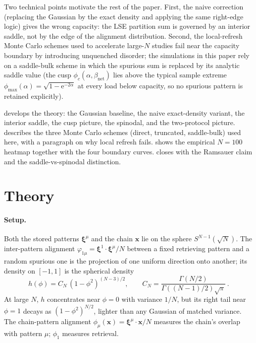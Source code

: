 \documentclass[11pt]{article}
\newcommand{\bxi}{\boldsymbol{\xi}}
\newcommand{\bx}{\bm{x}}
\newcommand{\e}{{\mathrm{e}}}
\newcommand{\Bnet}{\beta_{\mathrm{net}}}
\begin{document}
Two technical points motivate the rest of the paper.  First, the naive
correction (replacing the Gaussian by the exact density and applying
the same right-edge logic) gives the wrong capacity: the LSE partition
sum is governed by an interior saddle, not by the edge of the alignment
distribution.  Second, the local-refresh Monte Carlo schemes used to
accelerate large-$N$ studies fail near the capacity boundary by
introducing unquenched disorder; the simulations in this paper rely on a
saddle-bulk scheme in which the spurious sum is replaced by its analytic
saddle value (the cusp $\phi_c(\alpha, \Bnet)$ lies above the typical
sample extreme $\phi_{\max}(\alpha) = \sqrt{1 - \e^{-2\alpha}}$ at every
load below capacity, so no spurious pattern is retained explicitly).

 develops the theory: the Gaussian baseline, the naive
exact-density variant, the interior saddle, the cusp picture, the
spinodal, and the two-protocol picture.   describes the
three Monte Carlo schemes (direct, truncated, saddle-bulk) used here, with a
paragraph on why local refresh fails.   shows the
empirical $N = 100$ heatmap together with the four boundary curves.
 closes with the Ramsauer claim and the
saddle-vs-spinodal distinction.

\section{Theory}
\label{sec:theory}

\paragraph{Setup.}
Both the stored patterns $\bxi^\mu$ and the chain $\bx$ lie on the
sphere $S^{N-1}(\sqrt N)$.  The inter-pattern alignment
$\varphi_{1\mu} = \bxi^1 \cdot \bxi^\mu / N$ between a fixed retrieving
pattern and a random spurious one is the projection of one uniform
direction onto another; its density on $[-1, 1]$ is the spherical
density
\begin{equation}
h(\phi) = C_N\,(1 - \phi^2)^{(N-3)/2},
\qquad
C_N = \frac{\Gamma(N/2)}{\Gamma((N-1)/2)\sqrt\pi}\,.
\label{eq:hphi}
\end{equation}
At large $N$, $h$ concentrates near $\phi = 0$ with variance $1/N$,
but its right tail near $\phi = 1$ decays as $(1-\phi^2)^{N/2}$,
lighter than any Gaussian of matched variance.  The chain-pattern
alignment $\phi_\mu(\bx) = \bxi^\mu \cdot \bx / N$ measures the chain's
overlap with pattern $\mu$; $\phi_1$ measures retrieval.
\end{document}
